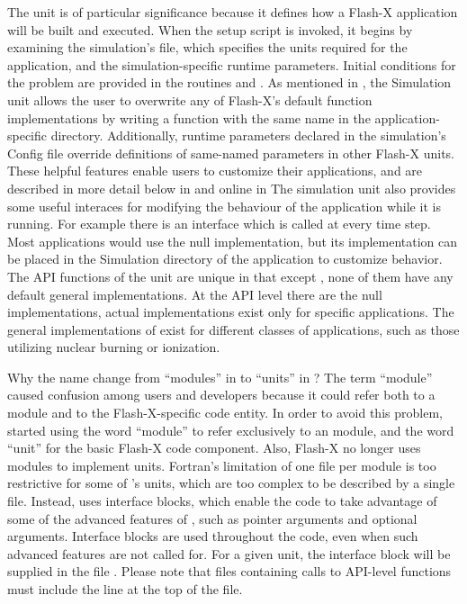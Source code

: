 The  unit is of particular significance because it defines how a Flash-X
application will be built and executed. When the setup script is invoked, it begins
by examining the simulation's  file, which specifies the units required for
the application, and the simulation-specific runtime parameters. 
Initial conditions for the problem are provided in the routines  and
.
As mentioned in , the \unit{Simulation} unit allows the user
to overwrite any of Flash-X's default function implementations by writing a function with
the same name in the application-specific directory. Additionally, runtime parameters
declared in the simulation's \unit{Config} file override definitions of same-named parameters
in other Flash-X units. These helpful features enable users to
customize their applications, and are described in more detail below in
 and online in %
The simulation unit also provides some useful interaces for modifying
the behaviour of the application while it is running. For example
there is an interface  which is
called at every time step. Most applications would use the null
implementation, but its implementation can be placed in the Simulation
directory of the application to customize behavior. The API functions
of the  unit are unique in that except
, none of them have any default general 
implementations. At the API level there are the 
null implementations, actual implementations exist only for specific 
applications. The general implementations of 
exist for different  classes of applications, such as those utilizing
nuclear burning or ionization. 

\begin{flashtip}
Why the name change from ``modules'' in \flashx to ``units'' in \flashx?
The term ``module'' caused confusion among users and developers because it could refer both
to a  module and to the Flash-X-specific code entity. In order to avoid this problem, \flashx started using
the word ``module'' to refer exclusively to an  module, and the word ``unit'' for the
basic Flash-X code component. Also, Flash-X no longer uses  modules to implement
units.  Fortran's limitation of one file per module is too restrictive for some of
\flashx's units, which are too complex to be described by a single file. Instead, \flashx uses
interface blocks, which enable the code to take advantage of some of the advanced features of ,
such as pointer arguments and optional arguments. Interface blocks are used throughout the code,
even when such advanced features are not called for. For a given unit, the interface block will be supplied
in the file . Please note that files containing calls to API-level functions
must include the line  at the top of the file.
\end{flashtip}

